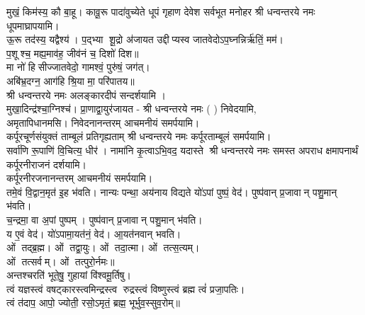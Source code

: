 {मुखं॒ किम॑स्य॒ कौ बा॒हू। कावू॒रू पादा॑वुच्येते}
{धूपं गृहाण देवेश सर्वभूत मनोहर}
श्री धन्वन्तरये नमः धूपमाघ्रापयामि।\\
 
{ऊ॒रू तद॑स्य॒ यद्वैश्य॑। प॒द्भ्या शू॒द्रो अ॑जायत}
उद्दीप्यस्व जातवेदोऽप॒घ्नन्निर्ऋ॑तिं॒ मम॑।\\
 प॒शूश्च॒ मह्य॒माव॑ह॒ जीव॑नं च॒ दिशो॑ दिश॥ \\
मा नो॑ हिसीज्जातवेदो॒ गामश्वं॒ पुरु॑षं॒ जग॑त्।\\
अबि॑भ्र॒दग्न॒ आग॑हि श्रि॒या मा॒ परि॑पातय॥ \\
श्री धन्वन्तरये नमः अलङ्कारदीपं सन्दर्शयामि ।\\

 {मुखा॒दिन्द्र॑श्चा॒ग्निश्च॑। प्रा॒णाद्वा॒युर॑जायत}
- श्री धन्वन्तरये नमः (	) निवेदयामि, \\
अमृतापिधानमसि। निवेदनानन्तरम् आचमनीयं समर्पयामि।\\
{कर्पूरचूर्णसंयुक्तं ताम्बूलं प्रतिगृह्यताम्}
श्री धन्वन्तरये नमः कर्पूरताम्बूलं समर्पयामि।\\

{सर्वा॑णि रू॒पाणि॑ वि॒चित्य॒ धीर॑। नामा॑नि कृ॒त्वाऽभि॒वद॒\an{} यदास्ते}
श्री धन्वन्तरये नमः समस्त अपराध क्षमापनार्थं कर्पूरनीराजनं दर्शयामि।\\
कर्पूरनीरजनानन्तरम् आचमनीयं समर्पयामि।\\

 {तमे॒वं वि॒द्वान॒मृत॑ इ॒ह भ॑वति। नान्यः पन्था॒ अय॑नाय विद्यते}
 यो॑ऽपां पुष्पं॒ वेद॑। पुष्प॑वान् प्र॒जावान् पशु॒मान् भ॑वति।\\
च॒न्द्रमा॒ वा अ॒पां पुष्पम्। पुष्प॑वान् प्र॒जावान् पशु॒मान् भ॑वति।\\
य ए॒वं वेद॑। यो॑ऽपामा॒यत॑नं॒ वेद॑। आ॒यत॑नवान् भवति।\\

ओं तद्ब्र॒ह्म। ओं तद्वा॒युः। ओं तदा॒त्मा। ओं तत्स॒त्यम्‌।\\
ओं तत्सर्वम्‌। ओं तत्पुरो॒र्नमः॥\\

अन्तश्चरति॑ भूते॒षु॒ गुहायां वि॑श्वमू॒र्तिषु। \\
त्वं यज्ञस्त्वं वषट्कारस्त्वमिन्द्रस्त्व रुद्रस्त्वं विष्णुस्त्वं ब्रह्म त्वं॑ प्रजा॒पतिः। \\
त्वं त॑दाप॒ आपो॒ ज्योती॒ रसो॒ऽमृतं॒ ब्रह्म॒ भूर्भुव॒स्सुव॒रोम्‌॥\\

